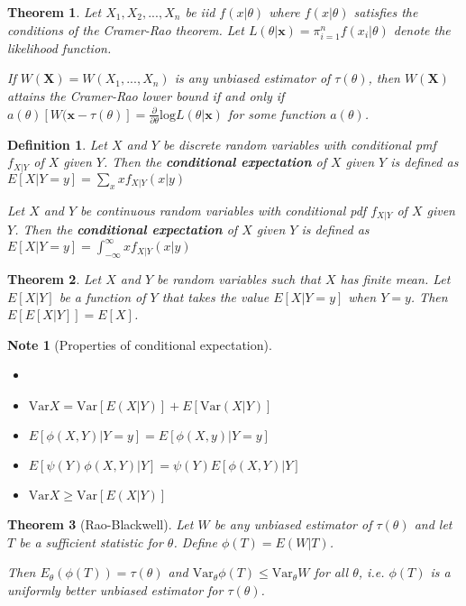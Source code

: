 \documentclass[14pt,twoside]{extreport}
\theoremstyle{dotless}
\newtheorem*{defn}{Definition}
\newtheorem*{thm}{Theorem} %
\newtheorem*{note}{Note} %
\begin{document}
\begin{thm}
    Let $X_1, X_2, ..., X_n$ be iid $f(x|\theta)$ where $f(x|\theta)$ satisfies the conditions of the Cramer-Rao theorem. Let $L(\theta|\bm{x}) = \pi_{i = 1}^n f(x_i|\theta)$ denote the likelihood function.

    If $W(\bm{X}) = W(X_1,..., X_n)$ is any unbiased estimator of $\tau(\theta)$, then $W(\bm{X})$ attains the Cramer-Rao lower bound if and only if $a(\theta)[W(\bm{x} - \tau(\theta)] = \frac{\partial}{\partial \theta} \text{log}L(\theta|\bm{x})$ for some function $a(\theta)$.
\end{thm}

\begin{defn}
    Let $X$ and $Y$ be discrete random variables with conditional pmf $f_{X|Y}$ of $X$ given $Y$. Then the \textbf{conditional expectation} of $X$ given $Y$ is defined as $E[X|Y=y] = \sum_{x} x f_{X|Y}(x|y)$

    Let $X$ and $Y$ be continuous random variables with conditional pdf $f_{X|Y}$ of $X$ given $Y$. Then the \textbf{conditional expectation} of $X$ given $Y$ is defined as $E[X|Y=y] = \int_{-\infty}^\infty x f_{X|Y}(x|y)$
\end{defn}


\begin{thm}
    Let $X$ and $Y$ be random variables such that $X$ has finite mean. 
    Let $E[X|Y]$ be a function of $Y$ that takes the value $E[X|Y=y]$ when $Y=y$.
    Then $E[E[X|Y]] = E[X]$.
\end{thm}

\begin{note}[Properties of conditional expectation]
    \begin{itemize}
        \item[]
        \item $\text{Var}X = \text{Var}[E(X|Y)] + E[\text{Var}(X|Y)]$
        \item $E[\phi(X,Y)|Y=y] = E[\phi(X,y)|Y=y]$
        \item $E[\psi(Y) \phi(X,Y)|Y] = \psi(Y) E[\phi(X,Y)|Y]$
        \item $\text{Var}X \geq \text{Var}[E(X|Y)]$
    \end{itemize}
\end{note}

\begin{thm}[Rao-Blackwell]
    Let $W$ be any unbiased estimator of $\tau(\theta)$ and let $T$ be a sufficient statistic for $\theta$. 
    Define $\phi(T) = E(W|T)$.

    Then $E_\theta(\phi(T)) = \tau(\theta)$ and $\text{Var}_\theta \phi(T) \leq \text{Var}_\theta W$ for all $\theta$, i.e. $\phi(T)$ is a uniformly better unbiased estimator for $\tau(\theta)$.
\end{thm}
\end{document}
